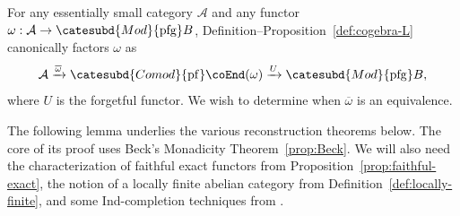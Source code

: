 For any essentially small category $\mathcal{A}$ and any functor
$\omega:\mathcal{A}\to\catesubd{Mod}{\mathrm{pfg}}B$,
Definition--Proposition~\ref{def:cogebra-L} canonically factors $\omega$ as
\begin{equation}\label{eqn:L-canonical-decomp}
	\mathcal{A} \xrightarrow{\overline{\omega}} \catesubd{Comod}{\mathrm{pf}}\coEnd(\omega) \xrightarrow{U} \catesubd{Mod}{\mathrm{pfg}}B,
\end{equation}
where $U$ is the forgetful functor. We wish to determine when
$\overline\omega$ is an equivalence.

The following lemma underlies the various reconstruction theorems below.
The core of its proof uses Beck's Monadicity Theorem~\ref{prop:Beck}. We
will also need the characterization of faithful exact functors from
Proposition~\ref{prop:faithful-exact}, the notion of a locally finite
abelian category from Definition~\ref{def:locally-finite}, and some
Ind-completion techniques from .

